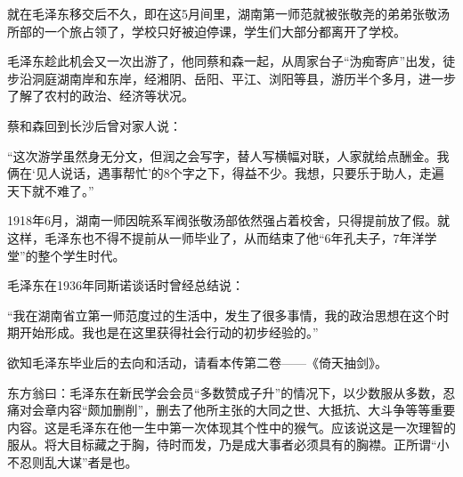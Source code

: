 \documentclass[../../dazhuan.tex]{subfiles}
\begin{document}
就在毛泽东移交后不久，即在这5月间里，湖南第一师范就被张敬尧的弟弟张敬汤所部的一个旅占领了，学校只好被迫停课，学生们大部分都离开了学校。

毛泽东趁此机会又一次出游了，他同蔡和森一起，从周家台子“沩痴寄庐”出发，徒步沿洞庭湖南岸和东岸，经湘阴、岳阳、平江、浏阳等县，游历半个多月，进一步了解了农村的政治、经济等状况。

蔡和森回到长沙后曾对家人说：

“这次游学虽然身无分文，但润之会写字，替人写横幅对联，人家就给点酬金。我俩在‘见人说话，遇事帮忙’的8个字之下，得益不少。我想，只要乐于助人，走遍天下就不难了。”

1918年6月，湖南一师因皖系军阀张敬汤部依然强占着校舍，只得提前放了假。就这样，毛泽东也不得不提前从一师毕业了，从而结束了他“6年孔夫子，7年洋学堂”的整个学生时代。

毛泽东在1936年同斯诺谈话时曾经总结说：

“我在湖南省立第一师范度过的生活中，发生了很多事情，我的政治思想在这个时期开始形成。我也是在这里获得社会行动的初步经验的。”

欲知毛泽东毕业后的去向和活动，请看本传第二卷——《倚天抽剑》。

东方翁曰：毛泽东在新民学会会员“多数赞成子升”的情况下，以少数服从多数，忍痛对会章内容“颇加删削”，删去了他所主张的大同之世、大抵抗、大斗争等等重要内容。这是毛泽东在他一生中第一次体现其个性中的猴气。应该说这是一次理智的服从。将大目标藏之于胸，待时而发，乃是成大事者必须具有的胸襟。正所谓“小不忍则乱大谋”者是也。 
\end{document}
